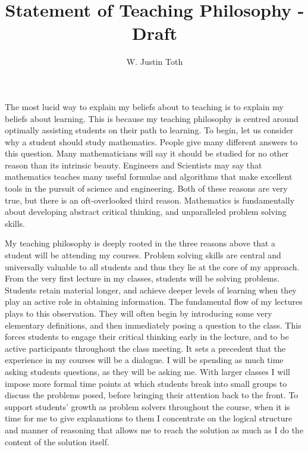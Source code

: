 \documentclass{article}
\title{Statement of Teaching Philosophy - Draft}
\author{W. Justin Toth}
\begin{document}
\maketitle
\newpage
\section*{}
\paragraph{}
The most lucid way to explain my beliefs about to teaching is to explain my beliefs about learning. This is because my teaching philosophy is centred around optimally assisting students on their path to learning. To begin, let us consider why a student should study mathematics. People give many different answers to this question. Many mathematicians will say it should be studied for no other reason than its intrinsic beauty. Engineers and Scientists may say that mathematics teaches many useful formulae and algorithms that make excellent tools in the pursuit of science and engineering. Both of these reasons are very true, but there is an oft-overlooked third reason. Mathematics is fundamentally about developing abstract critical thinking, and unparalleled problem solving skills. 

My teaching philosophy is deeply rooted in the three reasons above that a student will be attending my courses. Problem solving skills are central and universally valuable to all students and thus they lie at the core of my approach. From the very first lecture in my classes, students will be solving problems. Students retain material longer, and achieve deeper levels of learning when they play an active role in obtaining information. The fundamental flow of my lectures plays to this observation. They will often begin by introducing some very elementary definitions, and then immediately posing a question to the class. This forces students to engage their critical thinking early in the lecture, and to be active participants throughout the class meeting. It sets a precedent that the experience in my courses will be a dialogue. I will be spending as much time asking students questions, as they will be asking me. With larger classes I will impose more formal time points at which students break into small groups to discuss the problems posed, before bringing their attention back to the front. To support students' growth as problem solvers throughout the course, when it is time for me to give explanations to them I concentrate on the logical structure and manner of reasoning that allows me to reach the solution as much as I do the content of the solution itself.
\end{document}

